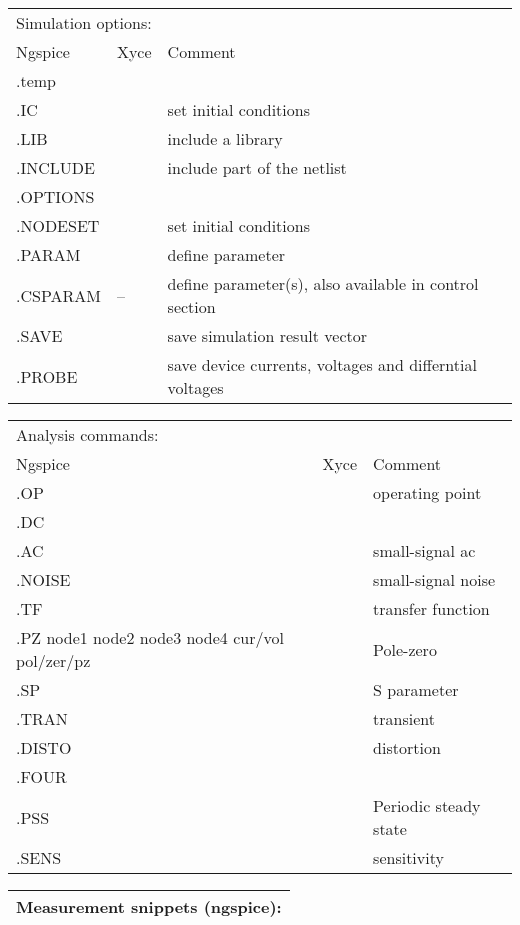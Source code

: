 \documentclass[10pt,a4paper]{article}
\begin{document}
	\begin{tabular}{lll}%
		\toprule
		\multicolumn{3}{l}{Simulation options:}\\
		Ngspice & Xyce & Comment\\
		\midrule
		.temp &&\\
		.IC &&set initial conditions\\
		.LIB &&include a library\\
		.INCLUDE&& include part of the netlist\\
		.OPTIONS&&\\
		.NODESET&&set initial conditions\\
		.PARAM&&define parameter\\
		.CSPARAM&--& define parameter(s), also available in control section\\
		.SAVE&&save simulation result vector\\
		.PROBE&&save device currents, voltages and differntial voltages\\
		\bottomrule
	\end{tabular}
	
	\newpage
	
	\begin{tabular}{lll}%
		\toprule
		\multicolumn{3}{l}{Analysis commands:}\\
		Ngspice & Xyce & Comment\\
		\midrule
		.OP&&operating point\\
		.DC&&\\
		.AC&&small-signal ac\\
		.NOISE&&small-signal noise\\
		.TF&&transfer function\\
		.PZ node1 node2 node3 node4 cur/vol pol/zer/pz &&Pole-zero\\
		.SP&&S parameter\\
		.TRAN&&transient\\
		.DISTO&&distortion\\
		.FOUR&&\\
		.PSS&&Periodic steady state \\
		.SENS&&sensitivity\\
		\bottomrule
	\end{tabular}
	
	\newpage
	
	\begin{tabular}{p{}p{}}
		\toprule
		\multicolumn{2}{l}{Measurement snippets (ngspice):}\\
		\midrule
		
		\bottomrule
	\end{tabular}
	
\end{document}
